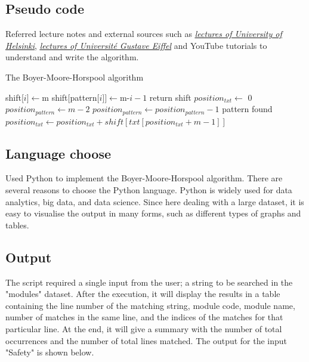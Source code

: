 \documentclass[12pt]{article}
\begin{document}
\subsection{Pseudo code}
Referred lecture notes and external sources such as \textit{\underline{ \href{https://www.cs.helsinki.fi/u/tpkarkka/teach/14-15/SPA/lecture05-2x4.pdf}{lectures of University of Helsinki}}}, \textit{\underline{\href{https://www-igm.univ-mlv.fr/~lecroq/string/node18.html}{lectures of Université Gustave Eiffel}}} and YouTube tutorials to understand and write the algorithm.
\begin{algorithm}
	\caption{The Boyer-Moore-Horspool algorithm}
	\begin{algorithmic}[1]
    		    \State shift[$i]\leftarrow$m
    	    \EndFor
    		    \State shift[pattern[$i]]\leftarrow$m-$i-1$
    	    \EndFor
    	    \State return shift
    	\EndFunction
    	\State
    	    \State $position_{txt} \leftarrow$ 0
    	            \State $position_{pattern} \leftarrow m -2$
                        \State $position_{pattern} \leftarrow position_{pattern} - 1$
    	                \State pattern found
    	            \EndIf
                    \EndWhile
    	        \EndIf
    	        \State $position_{txt} \leftarrow position_{txt} + shift[txt[position_{txt} + m - 1]]$
    	    \EndWhile
    	\EndFunction
	\end{algorithmic}
\end{algorithm}

\newpage

\subsection{Language choose}
Used Python to implement the Boyer-Moore-Horspool algorithm. There are several reasons to choose the Python language. Python is widely used for data analytics, big data, and data science. Since here dealing with a large dataset, it is easy to visualise the output in many forms, such as different types of graphs and tables.

\subsection{Output}
The script required a single input from the user; a string to be searched in the "modules" dataset. After the execution, it will display the results in a table containing the line number of the matching string, module code, module name, number of matches in the same line, and the indices of the matches for that particular line. At the end, it will give a summary with the number of total occurrences and the number of total lines matched. The output for the input "Safety" is shown below.
\end{document}
